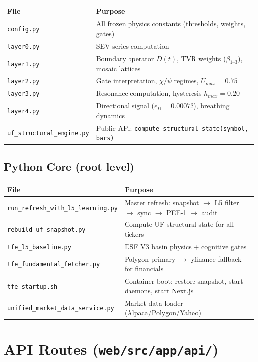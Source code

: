 \documentclass[11pt, a4paper]{article}
\begin{document}
\begin{longtable}{@{}p{4cm}p{10.5cm}@{}}
\toprule
\textbf{File} & \textbf{Purpose} \\
\midrule
\endhead
\texttt{config.py} & All frozen physics constants (thresholds, weights, gates) \\
\texttt{layer0.py} & SEV series computation \\
\texttt{layer1.py} & Boundary operator $D(t)$, TVR weights ($\beta_{1\text{--}3}$), mosaic lattices \\
\texttt{layer2.py} & Gate interpretation, $\chi/\psi$ regimes, $U_{max} = 0.75$ \\
\texttt{layer3.py} & Resonance computation, hysteresis $h_{max} = 0.20$ \\
\texttt{layer4.py} & Directional signal ($\epsilon_D = 0.00073$), breathing dynamics \\
\texttt{uf\_structural\_engine.py} & Public API: \texttt{compute\_structural\_state(symbol, bars)} \\
\bottomrule
\end{longtable}

\subsection{Python Core (root level)}

\begin{longtable}{@{}p{6.5cm}p{8cm}@{}}
\toprule
\textbf{File} & \textbf{Purpose} \\
\midrule
\endhead
\texttt{run\_refresh\_with\_l5\_learning.py} & Master refresh: snapshot $\to$ L5 filter $\to$ sync $\to$ PEE-1 $\to$ audit \\
\texttt{rebuild\_uf\_snapshot.py} & Compute UF structural state for all tickers \\
\texttt{tfe\_l5\_baseline.py} & DSF V3 basin physics + cognitive gates \\
\texttt{tfe\_fundamental\_fetcher.py} & Polygon primary $\to$ yfinance fallback for financials \\
\texttt{tfe\_startup.sh} & Container boot: restore snapshot, start daemons, start Next.js \\
\texttt{unified\_market\_data\_service.py} & Market data loader (Alpaca/Polygon/Yahoo) \\
\bottomrule
\end{longtable}

\section{API Routes (\texttt{web/src/app/api/})}
\end{document}
